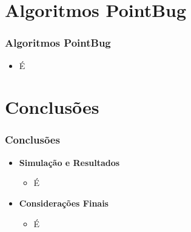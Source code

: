 \documentclass[xcolor=dvipsnames, aspectratio=169]{beamer}
\begin{document}
\section{Algoritmos PointBug}
\begin{frame}
  \frametitle{Algoritmos PointBug}
  \begin{itemize}
    \item É
  \end{itemize}
\end{frame}
  
  

\section{Conclusões}
\begin{frame}
  \frametitle{Conclusões}
  \begin{itemize}
    \item \textbf{Simulação e Resultados}
    \begin{itemize}
      \item É
    \end{itemize}
    \item \textbf{Considerações Finais}
    \begin{itemize}
      \item É
    \end{itemize}
  \end{itemize}
\end{frame}

\begin{frame}
    \printbibliography
\end{frame}


\begin{frame}
\titlepage %
\end{frame}
\end{document}
